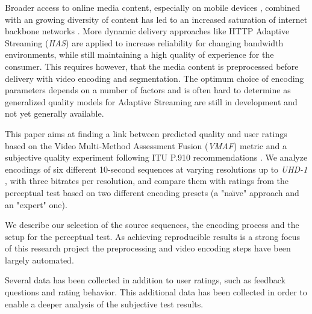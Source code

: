 Broader access to online media content, especially on mobile devices \cite{forecast2016cisco}, combined with an growing diversity of content has led to an increased saturation of internet backbone networks \cite{sandvine2010global}. More dynamic delivery approaches like HTTP Adaptive Streaming (\textit{HAS})\cite{seufert:2015:hassurvey} are applied to increase reliability for changing bandwidth environments, while still maintaining a high quality of experience for the consumer. This requires however, that the media content is preprocessed before delivery with video encoding and segmentation. The optimum choice of encoding parameters depends on a number of factors and is often hard to determine as generalized quality models for Adaptive Streaming are still in development \cite{raake:2017:hasqualitymodel} and not yet generally available. 

This paper aims at finding a link between predicted quality and user ratings based on the Video Multi-Method Assessment Fusion (\textit{VMAF}) metric \cite{lin2013:mmf,lin2014:fvqa} and a subjective quality experiment following ITU P.910 recommendations \cite{rec1998p}. We analyze encodings of six different 10-second sequences at varying resolutions up to \textit{UHD-1} \cite{dvb:2015:uhd1}, with three bitrates per resolution, and compare them with ratings from the perceptual test based on two different encoding presets (a "na\"{\i}ve" approach and an "expert" one).

We describe our selection of the source sequences, the encoding process and the setup for the perceptual test. As achieving reproducible results is a strong focus of this research project the preprocessing and video encoding steps have been largely automated.

Several data has been collected in addition to user ratings, such as feedback questions and rating behavior. This additional data has been collected in order to enable a deeper analysis of the subjective test results.